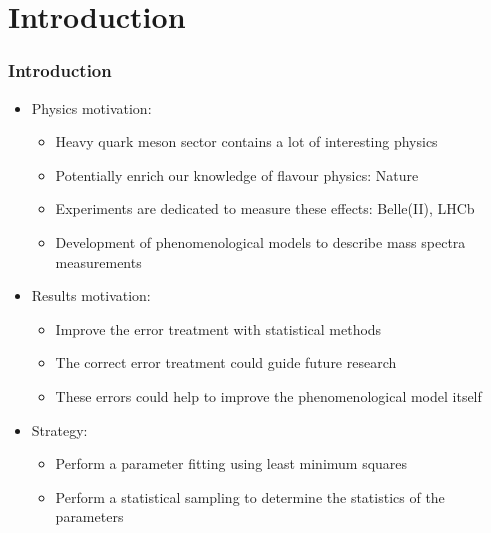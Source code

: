 \documentclass[10pt]{beamer}
\begin{document}
\section{Introduction}

\begin{frame}
\frametitle{Introduction}
\begin{beamerboxesrounded}[upper=uppercolor, lower=lowercolor, shadow=true]{} 
\begin{itemize}

\item Physics motivation:
\begin{itemize}
  \item Heavy quark meson sector contains a lot of interesting physics
  \item Potentially enrich our knowledge of flavour physics: Nature
  \item Experiments are dedicated to measure these effects: Belle(II), LHCb
  \item Development of phenomenological models to describe mass spectra measurements
\end{itemize}
\item Results motivation:
\begin{itemize}
  \item Improve the error treatment with statistical methods
  \item The correct error treatment could guide future research
  \item These errors could help to improve the phenomenological model itself
\end{itemize}
\item Strategy:
\begin{itemize}
   \item Perform a parameter fitting using least minimum squares
   \item Perform a statistical sampling to determine the statistics of the parameters
\end{itemize}

\end{itemize}
\end{beamerboxesrounded}

\end{frame}
\end{document}
